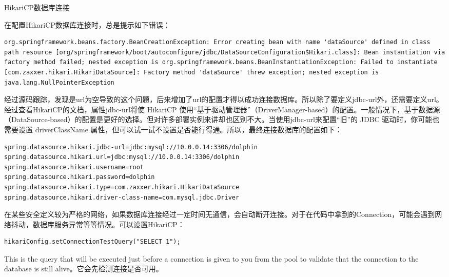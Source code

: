 \documentclass[12pt]{book}
\makeatletter
\numberwithin{dummy}{section}
\theoremstyle{ocrenumbox}
\theoremstyle{blacknumex}
\theoremstyle{blacknumbox}
\theoremstyle{ocrenum}
\renewcommand{\subsection}{\@startsection {subsection}{2}{\z@}
	{-3ex \@plus -0.1ex \@minus -.4ex}
	{0.5ex \@plus.2ex }
	{\normalfont\sffamily\bfseries}}
\makeatother
\begin{document}
\subsection{HikariCP数据库连接}

在配置HikariCP数据库连接时，总是提示如下错误：

\begin{lstlisting}
org.springframework.beans.factory.BeanCreationException: Error creating bean with name 'dataSource' defined in class path resource [org/springframework/boot/autoconfigure/jdbc/DataSourceConfiguration$Hikari.class]: Bean instantiation via factory method failed; nested exception is org.springframework.beans.BeanInstantiationException: Failed to instantiate [com.zaxxer.hikari.HikariDataSource]: Factory method 'dataSource' threw exception; nested exception is java.lang.NullPointerException
\end{lstlisting}

经过源码跟踪，发现是url为空导致的这个问题，后来增加了url的配置才得以成功连接数据库。所以除了要定义jdbc-url外，还需要定义url。经过查看HikariCP的文档，属性jdbc-url将使 HikariCP 使用“基于驱动管理器”（DriverManager-based）的配置。一般情况下，基于数据源（DataSource-based）的配置是更好的选择。但对许多部署实例来讲却也区别不大。当使用jdbc-url来配置“旧”的 JDBC 驱动时，你可能也需要设置 driverClassName 属性，但可以试一试不设置是否能行得通。所以，最终连接数据库的配置如下：

\begin{lstlisting}
spring.datasource.hikari.jdbc-url=jdbc:mysql://10.0.0.14:3306/dolphin
spring.datasource.hikari.url=jdbc:mysql://10.0.0.14:3306/dolphin
spring.datasource.hikari.username=root
spring.datasource.hikari.password=dolphin
spring.datasource.hikari.type=com.zaxxer.hikari.HikariDataSource
spring.datasource.hikari.driver-class-name=com.mysql.jdbc.Driver
\end{lstlisting}

在某些安全定义较为严格的网络，如果数据库连接经过一定时间无通信，会自动断开连接。对于在代码中拿到的Connection，可能会遇到网络抖动，数据库服务异常等等情况。可以设置HikariCP：

\begin{lstlisting}
hikariConfig.setConnectionTestQuery("SELECT 1");
\end{lstlisting}
        
This is the query that will be executed just before a connection is given to you from the pool to validate that the connection to the database is still alive。它会先检测连接是否可用。
\end{document}
